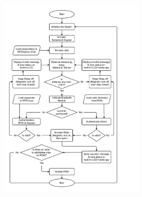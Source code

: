 \documentclass[conference, onecolumn]{IEEEtran}
\begin{document}
\begin{figure}[H]
	\centering
	\includegraphics[width=0.65\textwidth]{Untitled Diagram-Page-1.drawio.pdf}
\end{figure}	
\end{document}
